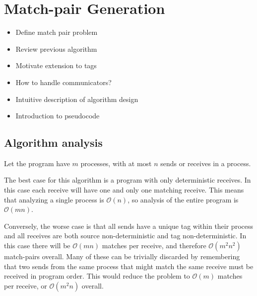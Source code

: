 \section{Match-pair Generation}
\begin{itemize}
\item Define match pair problem
\item Review previous algorithm
\item Motivate extension to tags
\item How to handle communicators?
\item Intuitive description of algorithm design
\item Introduction to pseudocode
\end{itemize}



\subsection{Algorithm analysis}
Let the program have $m$ processes, with at most $n$ sends or receives in a
process.

The best case for this algorithm is a program with only deterministic receives.
In this case each receive will have one and only one matching receive. This
means that analyzing a single process is $\mathcal{O}(n)$, so analysis of the
entire program is $\mathcal{O}(mn)$.

Conversely, the worse case is that all sends have a unique tag within their
process and all receives are both source non-deterministic and tag
non-deterministic. In this case there will be $\mathcal{O}(mn)$ matches per
receive, and therefore $\mathcal{O}(m^2n^2)$ match-pairs overall. Many of these
can be trivially discarded by remembering that two sends from the same process
that might match the same receive must be received in program order. This would
reduce the problem to $\mathcal{O}(m)$ matches per receive, or
$\mathcal{O}(m^2n)$ overall.

